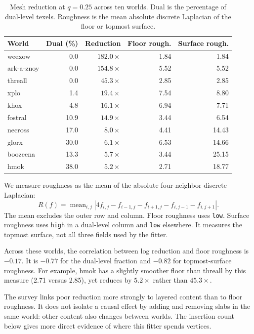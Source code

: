 \documentclass{jcgt}
\newcommand{\code}[1]{\texttt{#1}}
\begin{document}
\begin{table}[tbp]\centering\small
\caption{Mesh reduction at $q=0.25$ across ten worlds. Dual is the percentage of dual-level texels. Roughness is the mean absolute discrete Laplacian of the floor or topmost surface.}\label{tab:survey}
\setlength{\tabcolsep}{5pt}
\begin{tabular}{@{}lrrrr@{}}
\toprule
World & Dual (\%) & Reduction & Floor rough. & Surface rough. \\
\midrule
weexow & 0.0 & $182.0\times$ & 1.84 & 1.84 \\
ark-a-znoy & 0.0 & $154.8\times$ & 5.52 & 5.52 \\
threall & 0.0 & $45.3\times$ & 2.85 & 2.85 \\
xplo & 1.4 & $19.4\times$ & 7.54 & 8.80 \\
khox & 4.8 & $16.1\times$ & 6.94 & 7.71 \\
fostral & 10.9 & $14.9\times$ & 3.44 & 6.54 \\
necross & 17.0 & $8.0\times$ & 4.41 & 14.43 \\
glorx & 30.0 & $6.1\times$ & 6.53 & 14.66 \\
boozeena & 13.3 & $5.7\times$ & 3.44 & 25.15 \\
hmok & 38.0 & $5.2\times$ & 2.71 & 18.77 \\
\bottomrule
\end{tabular}
\end{table}

We measure roughness as the mean of the absolute four-neighbor discrete Laplacian:
\begin{equation}
R(f)=\operatorname{mean}_{i,j}
\left|4f_{i,j}-f_{i-1,j}-f_{i+1,j}-f_{i,j-1}-f_{i,j+1}\right|.
\end{equation}
The mean excludes the outer row and column. Floor roughness uses \code{low}. Surface roughness uses \code{high} in a dual-level column and \code{low} elsewhere. It measures the topmost surface, not all three fields used by the fitter.

Across these worlds, the correlation between log reduction and floor roughness is $-0.17$. It is $-0.77$ for the dual-level fraction and $-0.82$ for topmost-surface roughness. For example, hmok has a slightly smoother floor than threall by this measure (2.71 versus 2.85), yet reduces by $5.2\times$ rather than $45.3\times$.

The survey links poor reduction more strongly to layered content than to floor roughness. It does not isolate a causal effect by adding and removing slabs in the same world: other content also changes between worlds. The insertion count below gives more direct evidence of where this fitter spends vertices.
\end{document}
